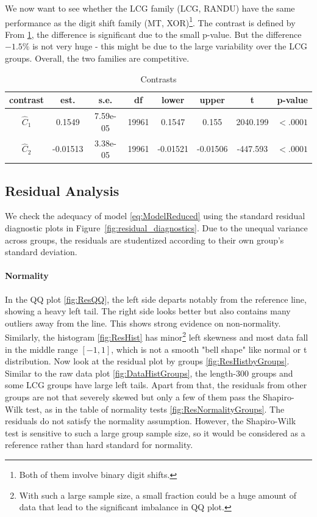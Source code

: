 \documentclass{report}
\begin{document}
We now want to see whether the LCG family (LCG, RANDU) have the same performance as the digit shift family (MT, XOR)\footnote{Both of them involve binary digit shifts.}. The contrast is defined by
From \ref{tab:Contrasts}, the difference is significant due to the small p-value. But the difference $-1.5\%$ is not very huge - this might be due to the large variability over the LCG groups. Overall, the two families are competitive.


\begin{table}[h]
\centering
\begin{tabular}{cccccccc}
    \hline
    contrast & est. & s.e. & df & lower & upper & t & p-value\\ \hline
    $\hat{C}_1$ & 0.1549 & 7.59e-05 & 19961 & 0.1547 & 0.155 & 2040.199 & $<.0001$\\
    $\hat{C}_2$ & -0.01513 & 3.38e-05 & 19961 & -0.01521 & -0.01506 & -447.593 & $<.0001$\\
    \hline
\end{tabular}
\caption{Contrasts}
\label{tab:Contrasts}
\end{table}


\newpage
\subsection{Residual Analysis}
We check the adequacy of model \eqref{eq:ModelReduced} using the standard residual diagnostic plots in Figure~\ref{fig:residual_diagnostics}. Due to the unequal variance across groups, the residuals are studentized according to their own group's standard deviation.

\paragraph{Normality}
In the QQ plot \ref{fig:ResQQ}, the left side departs notably from the reference line, showing a heavy left tail. The right side looks better but also contains many outliers away from the line. This shows strong evidence on non-normality. Similarly, the histogram \ref{fig:ResHist} has minor\footnote{With such a large sample size, a small fraction could be a huge amount of data that lead to the significant imbalance in QQ plot.} left skewness and most data fall in the middle range $[-1,1]$, which is not a smooth "bell shape" like normal or t distribution. Now look at the residual plot by groups \ref{fig:ResHistbyGroups}. Similar to the raw data plot \ref{fig:DataHistGroups}, the length-300 groups and some LCG groups have large left tails. Apart from that, the residuals from other groups are not that severely skewed but only a few of them pass the Shapiro-Wilk test, as in the table of normality tests \ref{fig:ResNormalityGroups}. The residuals do not satisfy the normality assumption. However, the Shapiro-Wilk test is sensitive to such a large group sample size, so it would be considered as a reference rather than hard standard for normality.
\end{document}
